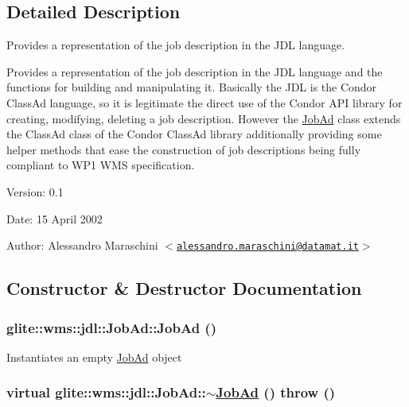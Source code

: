 \subsection{Detailed Description}
Provides a representation of the job description in the JDL language. 

Provides a representation of the job description in the JDL language and the functions for building and manipulating it. Basically the JDL is the Condor Class\-Ad language, so it is legitimate the direct use of the Condor API library for creating, modifying, deleting a job description. However the \hyperlink{classglite_1_1wms_1_1jdl_1_1JobAd}{Job\-Ad} class extends the Class\-Ad class of the Condor Class\-Ad library additionally providing some helper methods that ease the construction of job descriptions being fully compliant to WP1 WMS specification.

\begin{Desc}
\item[Version:]0.1 \end{Desc}
\begin{Desc}
\item[Date:]15 April 2002 \end{Desc}
\begin{Desc}
\item[Author:]Alessandro Maraschini $<$\href{mailto:alessandro.maraschini@datamat.it}{\tt alessandro.maraschini@datamat.it}$>$ \end{Desc}




\subsection{Constructor \& Destructor Documentation}
\hypertarget{classglite_1_1wms_1_1jdl_1_1JobAd_z1_0}{
\subsubsection[JobAd]{\setlength{\rightskip}{0pt plus 5cm}glite::wms::jdl::Job\-Ad::Job\-Ad ()}}
\label{classglite_1_1wms_1_1jdl_1_1JobAd_z1_0}


Instantiates an empty \hyperlink{classglite_1_1wms_1_1jdl_1_1JobAd}{Job\-Ad} object \hypertarget{classglite_1_1wms_1_1jdl_1_1JobAd_z1_1}{
\subsubsection[$\sim$JobAd]{\setlength{\rightskip}{0pt plus 5cm}virtual glite::wms::jdl::Job\-Ad::$\sim$\hyperlink{classglite_1_1wms_1_1jdl_1_1JobAd}{Job\-Ad} ()  throw ()}}
\label{classglite_1_1wms_1_1jdl_1_1JobAd_z1_1}


